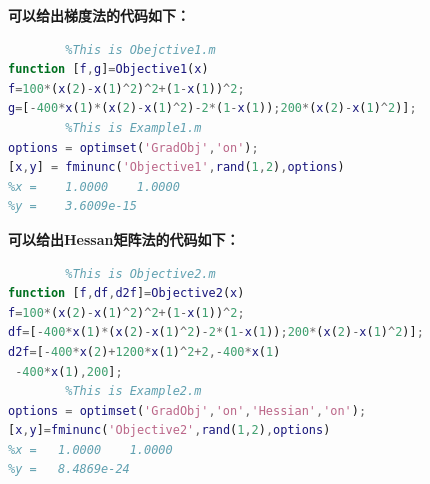 \documentclass[a4paper,20pt]{article}
\begin{document}
    \par \noindent \textbf{可以给出梯度法的代码如下：}
    \begin{center}
        \begin{lstlisting}[caption={Fminunc\_1},language=Matlab]
% NonLinear Programming
        %This is Obejctive1.m
function [f,g]=Objective1(x) 
f=100*(x(2)-x(1)^2)^2+(1-x(1))^2; 
g=[-400*x(1)*(x(2)-x(1)^2)-2*(1-x(1));200*(x(2)-x(1)^2)];
        %This is Example1.m
options = optimset('GradObj','on');
[x,y] = fminunc('Objective1',rand(1,2),options)
%x =    1.0000    1.0000
%y =    3.6009e-15
        \end{lstlisting}
    \end{center}
    \par \noindent \textbf{可以给出Hessan矩阵法的代码如下：}
    \begin{center}
        \begin{lstlisting}[caption={Fminunc\_2},language=Matlab]
% NonLinear Programming
        %This is Objective2.m
function [f,df,d2f]=Objective2(x)
f=100*(x(2)-x(1)^2)^2+(1-x(1))^2; 
df=[-400*x(1)*(x(2)-x(1)^2)-2*(1-x(1));200*(x(2)-x(1)^2)]; 
d2f=[-400*x(2)+1200*x(1)^2+2,-400*x(1) 
 -400*x(1),200];
        %This is Example2.m
options = optimset('GradObj','on','Hessian','on');
[x,y]=fminunc('Objective2',rand(1,2),options)
%x =   1.0000    1.0000
%y =   8.4869e-24
        \end{lstlisting}
    \end{center}
\end{document}

